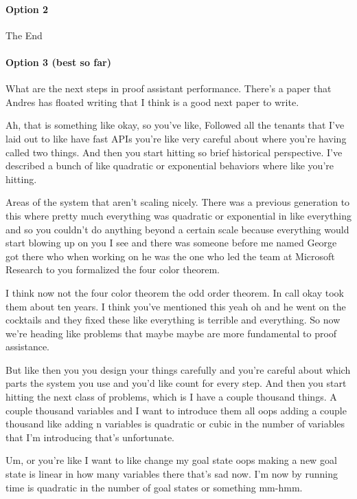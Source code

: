 \begin{subappendices}
\paragraph{Option 2}

The End


\paragraph{Option 3 (best so far)}

What are the next steps in proof assistant performance.  There's a paper that Andres has floated writing that I think is a good next paper to write.

Ah, that is something like okay, so you've like, Followed all the tenants that I've laid out to like have fast APIs you're like very careful about where you're having called two things. And then you start hitting so brief historical perspective. I've described a bunch of like quadratic or exponential behaviors where like you're hitting.

Areas of the system that aren't scaling nicely. There was a previous generation to this where pretty much everything was quadratic or exponential in like everything and so you couldn't do anything beyond a certain scale because everything would start blowing up on you I see and there was someone before me named George got there who when working on he was the one who led the team at Microsoft Research to you formalized the four color theorem.

I think now not the four color theorem the odd order theorem. In call okay took them about ten years. I think you've mentioned this yeah oh and he went on the cocktails and they fixed these like everything is terrible and everything. So now we're heading like problems that maybe maybe are more fundamental to proof assistance.

But like then you you design your things carefully and you're careful about which parts the system you use and you'd like count for every step. And then you start hitting the next class of problems, which is I have a couple thousand things. A couple thousand variables and I want to introduce them all oops adding a couple thousand like adding n variables is quadratic or cubic in the number of variables that I'm introducing that's unfortunate.

Um, or you're like I want to like change my goal state oops making a new goal state is linear in how many variables there that's sad now. I'm now by running time is quadratic in the number of goal states or something mm-hmm.


\end{subappendices}

